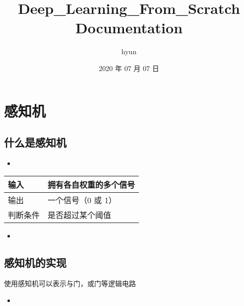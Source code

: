 \documentclass[letterpaper,10pt,english]{sphinxmanual}
\title{Deep\_Learning\_From\_Scratch Documentation}
\date{2020 年 07 月 07 日}
\author{hyun}
\begin{document}
\maketitle
\sphinxtableofcontents
{}\label{\detokenize{index::doc}}



\chapter{感知机}
\label{\detokenize{_u611f_u77e5_u673a:deep-learning-from-scratch}}\label{\detokenize{_u611f_u77e5_u673a:id1}}\label{\detokenize{_u611f_u77e5_u673a::doc}}

\section{什么是感知机}
\label{\detokenize{_u611f_u77e5_u673a:id2}}\begin{itemize}
\item {} 

\end{itemize}

\noindent{}


\begin{savenotes}\sphinxattablestart
\centering
\begin{tabulary}{\linewidth}[t]{|T|T|}
\hline

输入
&
拥有各自权重的多个信号
\\
\hline
输出
&
一个信号（0 或 1）
\\
\hline
判断条件
&
是否超过某个阈值
\\
\hline
\end{tabulary}
\par
\sphinxattableend\end{savenotes}
\begin{itemize}
\item {} 
\begin{quote}

\noindent{}
\end{quote}

\end{itemize}


\section{感知机的实现}
\label{\detokenize{_u611f_u77e5_u673a:id3}}
使用感知机可以表示与门，或门等逻辑电路
\begin{itemize}
\item {} 

\end{itemize}
\end{document}
